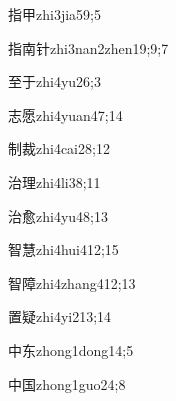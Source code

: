\begin{verbete}{指甲}{zhi3jia5}{9;5}
\end{verbete}

\begin{verbete}{指南针}{zhi3nan2zhen1}{9;9;7}
\end{verbete}

\begin{verbete}{至于}{zhi4yu2}{6;3}
\end{verbete}

\begin{verbete}{志愿}{zhi4yuan4}{7;14}
\end{verbete}

\begin{verbete}{制裁}{zhi4cai2}{8;12}
\end{verbete}

\begin{verbete}{治理}{zhi4li3}{8;11}
\end{verbete}

\begin{verbete}{治愈}{zhi4yu4}{8;13}
\end{verbete}

\begin{verbete}{智慧}{zhi4hui4}{12;15}
\end{verbete}

\begin{verbete}{智障}{zhi4zhang4}{12;13}
\end{verbete}

\begin{verbete}{置疑}{zhi4yi2}{13;14}
\end{verbete}

\begin{verbete}{中东}{zhong1dong1}{4;5}
\end{verbete}

\begin{verbete}{中国}{zhong1guo2}{4;8}
\end{verbete}


